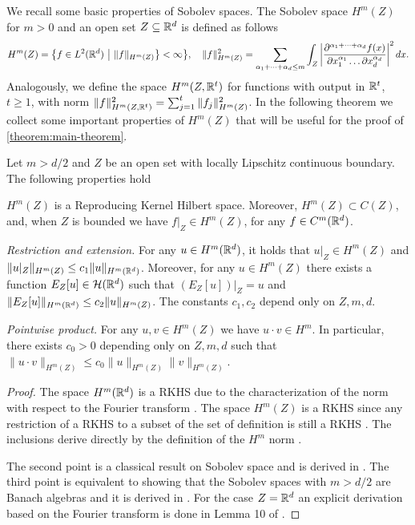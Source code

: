 We recall some basic properties of Sobolev spaces. The Sobolev space $H^m(Z)$ for $m > 0$ and an open set $Z \subseteq \mathbb R^d$ is defined as follows \cite{adams2003sobolev}
$$H^m(Z) = \big\{f \in L^2(\mathbb R^d) ~\big|~ \|f\|_{H^m(Z)}\big\} < \infty\big\}, \quad \|f\|^2_{H^m(Z)} = \sum_{\alpha_1+\dots+\alpha_d \leq m} \int_{Z} \left|\frac{\partial^{\alpha_1 + \dots + \alpha_d} f(x)}{\partial x_1^{\alpha_1} \dots \partial x_d^{\alpha_d}}\right|^2 dx.$$
Analogously, we define the space $H^m(Z, \mathbb R^t)$ for functions with output in $\mathbb R^t$, $t \geq 1$, with norm $\|f\|_{H^m(Z,\mathbb R^t)}^2 = \sum_{j=1}^t \|f_j\|_{H^m(Z)}^2$.
In the following theorem we collect some important properties of $H^m(Z)$ that will be useful for the proof of \cref{theorem:main-theorem}.
\begin{theorem}\label{thm:good-rkhs}
Let $m > d/2$ and $Z$ be an open set with locally Lipschitz continuous boundary. The following properties hold
\begin{enumthm}
    \item \label{thm:sobolev-containCinfty} $H^m(Z)$ is a Reproducing Kernel Hilbert space. Moreover, $H^m(Z) \subset C(Z)$, and, when $Z$ is bounded we have $f|_Z \in H^m(Z)$, for any $f \in C^m(\mathbb R^d)$.
    \item \label{thm:sobolev-restriction-extension} {\em Restriction and extension.}
    For any $u \in H^m(\mathbb R^d)$, it holds that $u|_Z \in H^m(Z)$ and $\|u|_Z\|_{H^m(Z)} \leq c_1 \|u\|_{H^m(\mathbb R^d)}$. Moreover, for any $u \in H^m(Z)$ there exists a function $E_Z[u] \in \mathcal H(\mathbb R^d)$ such that  $(E_Z[u])|_Z = u$ and $\|E_Z[u]\|_{H^m(\mathbb R^d)} \leq c_2\|u\|_{H^m(Z)}$. The constants $c_1,c_2$ depend only on $Z, m, d$.
    \item \label{thm:sobolev-pointwise-product} {\em Pointwise product.}
    For any $u, v \in H^m(Z)$ we have $u \cdot v \in H^m$. In particular, there exists $c_0 > 0$ depending only on $Z, m, d$ such that $\|u \cdot v\|_{H^m(Z)} \leq c_0 \|u\|_{H^m(Z)}\|v\|_{H^m(Z)}$.
\end{enumthm}
\end{theorem}
\begin{proof}
The space $H^m(\mathbb R^d)$ is a RKHS due to the characterization of the norm with respect to the Fourier transform \cite{wendland2004scattered}. The space $H^m(Z)$ is a RKHS since any restriction of a RKHS to a subset of the set of definition is still a RKHS \cite{aronszajn1950theory}. The inclusions derive directly by the definition of the $H^m$ norm \citep[see][for more embeddings of Sobolev spaces]{adams2003sobolev}.

The second point is a classical result on Sobolev space and is derived in \citet{adams2003sobolev}. The third point is equivalent to showing that the Sobolev spaces with $m > d/2$ are Banach algebras and it is derived in \citet{adams2003sobolev}. For the case $Z=\mathbb R^d$ an explicit derivation based on the Fourier transform is done in Lemma 10 of \citet{rudi2020finding}.
\end{proof}



